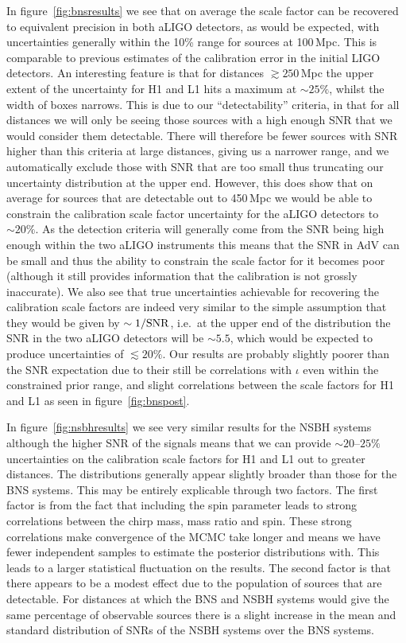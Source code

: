 \documentclass[10pt]{iopart}
\begin{document}
In figure~\ref{fig:bnsresults} we see that on average the scale factor can be recovered to 
equivalent precision in both \ac{aLIGO} detectors, as would be expected, with uncertainties 
generally within the 10\% range for sources at 100\,Mpc. This is comparable to previous estimates 
of the calibration error in the initial LIGO detectors. An interesting feature is that for 
distances $\gtrsim 250$\,Mpc the upper extent of the uncertainty for H1 and L1 hits a maximum at 
$\sim 25\%$, whilst the width of boxes narrows. This is due to our ``detectability'' criteria, 
in that for all distances we will only be seeing those sources with a high enough \ac{SNR} that we 
would consider them detectable. There will therefore be fewer sources with \ac{SNR} higher than 
this criteria at large distances, giving us a narrower range, and we automatically exclude those 
with \ac{SNR} that are too small thus truncating our uncertainty distribution at the upper end. 
However, this does show that on average for sources that are detectable out to 450\,Mpc we would be 
able to constrain the calibration scale factor uncertainty for the \ac{aLIGO} detectors to $\sim 
20\%$. As the detection criteria will generally come from the \ac{SNR} being high enough within the 
two \ac{aLIGO} instruments this means that the SNR in \ac{AdV} can be small and thus the ability to 
constrain the scale factor for it becomes poor (although it still provides information that the 
calibration is not grossly inaccurate). We also see that true uncertainties achievable for 
recovering the calibration scale factors are indeed very similar to the simple assumption that they 
would be given by $\sim 1/{\rm SNR}$, i.e.\ at the upper end of the distribution the \ac{SNR} in 
the two \ac{aLIGO} detectors will be $\sim 5.5$, which would be expected to produce uncertainties 
of $\lesssim 20\%$. Our results are probably slightly poorer than the \ac{SNR} expectation due to 
their still be correlations with $\iota$ even within the constrained prior range, and slight 
correlations between the scale factors for H1 and L1 as seen in figure~\ref{fig:bnspost}.

In figure~\ref{fig:nsbhresults} we see very similar results for the \ac{NSBH} systems although the 
higher \ac{SNR} of the signals means that we can provide $\sim 20\mbox{--}25\%$ uncertainties on 
the calibration scale factors for H1 and L1 out to greater distances. The distributions generally 
appear slightly broader than those for the \ac{BNS} systems. This may be entirely explicable 
through two factors. The first factor is from the fact that including the spin parameter leads to 
strong correlations between the chirp mass, mass ratio and spin. These strong correlations make 
convergence of the \ac{MCMC} take longer and means we have fewer independent samples to estimate 
the posterior distributions with. This leads to a larger statistical fluctuation on the results. 
The second factor is that there appears to be a modest effect due to the population of sources that 
are detectable. For distances at which the \ac{BNS} and \ac{NSBH} systems would give the same 
percentage of observable sources there is a slight increase in the mean and standard distribution 
of \acp{SNR} of the \ac{NSBH} systems over the \ac{BNS} systems.
\end{document}
